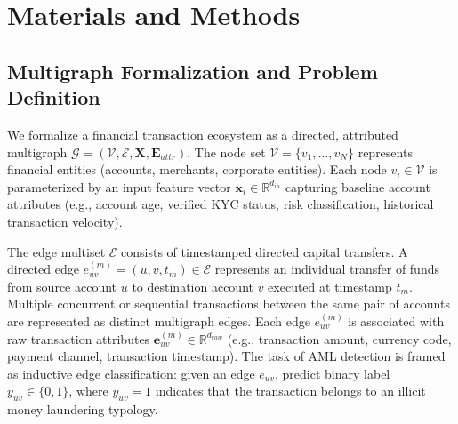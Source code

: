 \documentclass[10pt,twocolumn]{article}
\begin{document}
\section{Materials and Methods}

\subsection{Multigraph Formalization and Problem Definition}
We formalize a financial transaction ecosystem as a directed, attributed multigraph $\mathcal{G} = (\mathcal{V}, \mathcal{E}, \mathbf{X}, \mathbf{E}_{attr})$. The node set $\mathcal{V} = \{v_1, \dots, v_N\}$ represents financial entities (accounts, merchants, corporate entities). Each node $v_i \in \mathcal{V}$ is parameterized by an input feature vector $\mathbf{x}_i \in \mathbb{R}^{d_{in}}$ capturing baseline account attributes (e.g., account age, verified KYC status, risk classification, historical transaction velocity). 

The edge multiset $\mathcal{E}$ consists of timestamped directed capital transfers. A directed edge $e_{uv}^{(m)} = (u, v, t_m) \in \mathcal{E}$ represents an individual transfer of funds from source account $u$ to destination account $v$ executed at timestamp $t_m$. Multiple concurrent or sequential transactions between the same pair of accounts are represented as distinct multigraph edges. Each edge $e_{uv}^{(m)}$ is associated with raw transaction attributes $\mathbf{e}_{uv}^{(m)} \in \mathbb{R}^{d_{raw}}$ (e.g., transaction amount, currency code, payment channel, transaction timestamp). The task of AML detection is framed as inductive edge classification: given an edge $e_{uv}$, predict binary label $y_{uv} \in \{0, 1\}$, where $y_{uv} = 1$ indicates that the transaction belongs to an illicit money laundering typology.
\end{document}
